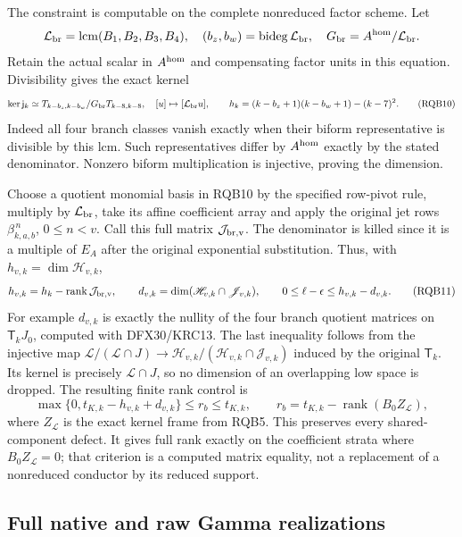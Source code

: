 \documentclass[10pt]{article}
\begin{document}
The constraint is computable on the complete nonreduced factor scheme.
Let
\[
 \mathcal L_{\rm br}=\operatorname{lcm}(B_1,B_2,B_3,B_4),
 \quad (b_z,b_w)=\operatorname{bideg}\mathcal L_{\rm br},\quad
 G_{\rm br}=A^{\rm hom}/\mathcal L_{\rm br}.
\]
Retain the actual scalar in $A^{\rm hom}$ and compensating factor
units in this equation. Divisibility gives the exact kernel
\[
 \ker\mathsf j_k\simeq
 T_{k-b_z,k-b_w}/G_{\rm br}T_{k-8,k-8},
 \quad [u]\mapsto[\mathcal L_{\rm br}u],\qquad
 h_k=(k-b_z+1)(k-b_w+1)-(k-7)^2 .
 \tag{RQB10}
\]
Indeed all four branch classes vanish exactly when their biform
representative is divisible by this lcm. Such representatives
differ by $A^{\rm hom}$ exactly by the stated denominator.
Nonzero biform multiplication is injective, proving the dimension.

Choose a quotient monomial basis in RQB10 by the specified row-pivot
rule, multiply by $\mathcal L_{\rm br}$, take its affine coefficient
array and apply the original jet rows
$\beta_{k,a,b}^{\,n}$, $0\le n<v$. Call this full matrix
$\mathcal J_{\rm br,v}$. The denominator is killed since it is a
multiple of $E_A$ after the original exponential substitution.
Thus, with $h_{v,k}=\dim\mathscr H_{v,k}$,
\[
 h_{v,k}=h_k-\operatorname{rank}\mathcal J_{\rm br,v},\qquad
 d_{v,k}=\dim(\mathscr H_{v,k}\cap\mathscr J_{v,k}),\qquad
 0\le\ell-\epsilon\le h_{v,k}-d_{v,k}.
 \tag{RQB11}
\]
For example $d_{v,k}$ is exactly the nullity of the four branch
quotient matrices on $\mathsf T_kJ_0$, computed with DFX30/KRC13.
The last inequality follows from the injective map
$\mathscr L/(\mathscr L\cap J)\to
\mathscr H_{v,k}/(\mathscr H_{v,k}\cap\mathscr J_{v,k})$
induced by the original $\mathsf T_k$. Its kernel is precisely
$\mathscr L\cap J$, so no dimension of an overlapping low space
is dropped. The resulting finite rank control is
\[
 \max\{0,t_{K,k}-h_{v,k}+d_{v,k}\}
       \le r_b\le t_{K,k},\qquad
 r_b=t_{K,k}-\operatorname{rank}(B_0Z_{\mathscr L}),
 \tag{RQB12}
\]
where $Z_{\mathscr L}$ is the exact kernel frame from RQB5.
This preserves every shared-component defect. It gives full rank
exactly on the coefficient strata where $B_0Z_{\mathscr L}=0$;
that criterion is a computed matrix equality, not a replacement
of a nonreduced conductor by its reduced support.

\subsection{Full native and raw Gamma realizations}
\end{document}
